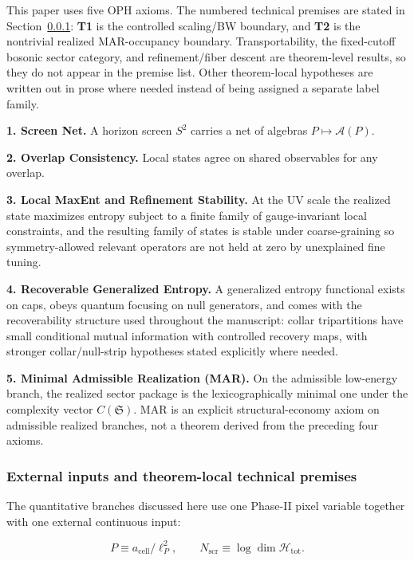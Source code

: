 This paper uses five OPH axioms. The numbered technical premises are stated in Section~\ref{14-assumptions-and-external-inputs}: \textbf{T1} is the controlled scaling/BW boundary, and \textbf{T2} is the nontrivial realized MAR-occupancy boundary. Transportability, the fixed-cutoff bosonic sector category, and refinement/fiber descent are theorem-level results, so they do not appear in the premise list. Other theorem-local hypotheses are written out in prose where needed instead of being assigned a separate label family.

\textbf{1. Screen Net.} A horizon screen \(S^2\) carries a net of algebras \(P \mapsto \mathcal{A}(P)\).

\textbf{2. Overlap Consistency.} Local states agree on shared observables for any overlap.

\textbf{3. Local MaxEnt and Refinement Stability.} At the UV scale the realized state maximizes entropy subject to a finite family of gauge-invariant local constraints, and the resulting family of states is stable under coarse-graining so symmetry-allowed relevant operators are not held at zero by unexplained fine tuning.

\textbf{4. Recoverable Generalized Entropy.} A generalized entropy functional exists on caps, obeys quantum focusing on null generators, and comes with the recoverability structure used throughout the manuscript: collar tripartitions have small conditional mutual information with controlled recovery maps, with stronger collar/null-strip hypotheses stated explicitly where needed.

\textbf{5. Minimal Admissible Realization (MAR).} On the admissible low-energy branch, the realized sector package is the lexicographically minimal one under the complexity vector \(C(\mathfrak S)\). MAR is an explicit structural-economy axiom on admissible realized branches, not a theorem derived from the preceding four axioms.

\subsubsection{External inputs and theorem-local technical premises}\label{14-assumptions-and-external-inputs}

The quantitative branches discussed here use one Phase-II pixel variable together with one
external continuous input:

\[
P \equiv a_{\mathrm{cell}}/\ell_P^2,
\qquad
N_{\mathrm{scr}} \equiv \log \dim \mathcal H_{\mathrm{tot}}.
\]

